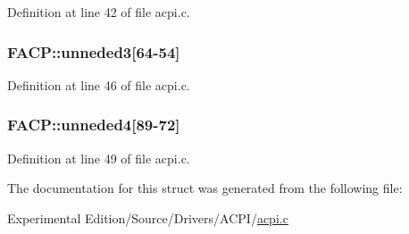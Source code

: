 Definition at line 42 of file acpi.\+c.

\subsubsection[{\texorpdfstring{unneded3}{unneded3}}]{ F\+A\+C\+P\+::unneded3\mbox{[}64-\/54\mbox{]}}\hypertarget{structFACP_aa83604b4fb4ca7634fc6da593f8a9d10}{}\label{structFACP_aa83604b4fb4ca7634fc6da593f8a9d10}


Definition at line 46 of file acpi.\+c.

\subsubsection[{\texorpdfstring{unneded4}{unneded4}}]{ F\+A\+C\+P\+::unneded4\mbox{[}89-\/72\mbox{]}}\hypertarget{structFACP_a8309a4015441febd7eebf3ed7524c2e7}{}\label{structFACP_a8309a4015441febd7eebf3ed7524c2e7}


Definition at line 49 of file acpi.\+c.



The documentation for this struct was generated from the following file\+:\begin{DoxyCompactItemize}
\item 
Experimental Edition/\+Source/\+Drivers/\+A\+C\+P\+I/\hyperlink{acpi_8c}{acpi.\+c}\end{DoxyCompactItemize}
